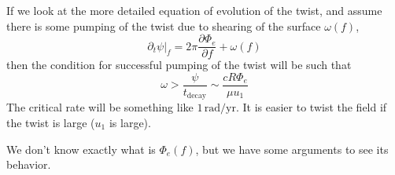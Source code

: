 \documentclass[letterpaper, 11pt]{article}
\numberwithin{equation}{section}
\numberwithin{figure}{section}
\begin{document}
If we look at the more detailed equation of evolution of the twist, and assume there is some pumping of the twist due to shearing of the surface $\omega(f)$,
\begin{equation}
    \label{eq:91}
    \left.\partial_t\psi\right|_f = 2\pi\frac{\partial\Phi_e}{\partial f} + \omega(f)
\end{equation}
then the condition for successful pumping of the twist will be such that
\begin{equation}
    \label{eq:92}
    \omega > \frac{\psi}{t_\mathrm{decay}} \sim \frac{c R\Phi_e}{\mu u_1}
\end{equation}
The critical rate will be something like $1\,\mathrm{rad/yr}$. It is easier to twist the field if the twist is large ($u_1$ is large).

We don't know exactly what is $\Phi_e(f)$, but we have some arguments to see its behavior.
\end{document}
